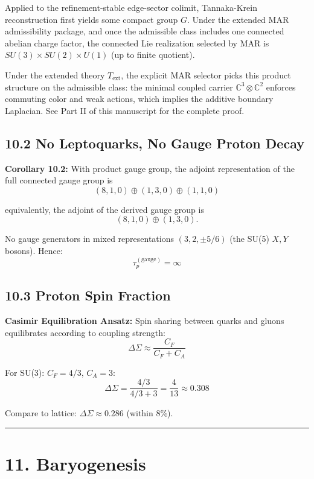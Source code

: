 Applied to the refinement-stable edge-sector colimit, Tannaka-Krein reconstruction first yields some compact group \(G\). Under the extended MAR admissibility package, and once the admissible class includes one connected abelian charge factor, the connected Lie realization selected by MAR is \(SU(3) \times SU(2) \times U(1)\) (up to finite quotient).

Under the extended theory \(T_{\mathrm{ext}}\), the explicit MAR selector picks this product structure on the admissible class: the minimal coupled carrier \(\mathbb{C}^3 \otimes \mathbb{C}^2\) enforces commuting color and weak actions, which implies the additive boundary Laplacian. See Part II of this manuscript for the complete proof.

\subsection{10.2 No Leptoquarks, No Gauge Proton Decay}\label{102-no-leptoquarks-no-gauge-proton-decay}

\textbf{Corollary 10.2:} With product gauge group, the adjoint representation of the full connected gauge group is \[(8,1,0) \oplus (1,3,0) \oplus (1,1,0)\]

equivalently, the adjoint of the derived gauge group is
\[
(8,1,0) \oplus (1,3,0).
\]

No gauge generators in mixed representations \((3,2,\pm 5/6)\) (the SU(5) \(X,Y\) bosons). Hence: \[\tau_p^{(\text{gauge})} = \infty\]

\subsection{10.3 Proton Spin Fraction}\label{103-proton-spin-fraction}

\textbf{Casimir Equilibration Ansatz:} Spin sharing between quarks and gluons equilibrates according to coupling strength: \[\Delta\Sigma \approx \frac{C_F}{C_F + C_A}\]

For SU(3): \(C_F = 4/3\), \(C_A = 3\): \[\Delta\Sigma = \frac{4/3}{4/3 + 3} = \frac{4}{13} \approx 0.308\]

Compare to lattice: \(\Delta\Sigma \approx 0.286\) (within 8\%).

\begin{center}\rule{0.5\linewidth}{0.5pt}\end{center}

\section{11. Baryogenesis}\label{11-baryogenesis}

